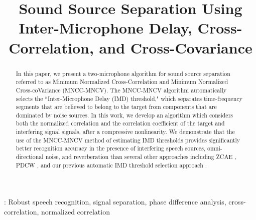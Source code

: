 \documentclass{article}
\title{Sound Source Separation Using Inter-Microphone Delay, Cross-Correlation,
and Cross-Covariance}
\begin{document}
%
  \maketitle
  \begin{abstract}
In this paper, we present a two-microphone algorithm for sound source separation 
    referred to as Minimum Normalized Cross-Correlation and Minimum Normalized 
    Cross-coVariance (MNCC-MNCV).  
    The MNCC-MNCV algorithm automatically selects the ``Inter-Microphone
    Delay (IMD) threshold," which separates time-frequency segments that are believed to
    belong to the target from components that are dominated by noise sources.
    In this work, we develop an algorithm which considers both the
    normalized correlation and the correlation coefficient of the target and
    interfering signal signals, after a compressive nonlinearity. 
We demonstrate that the use of the MNCC-MNCV method of estimating IMD
    thresholds  provides significantly better recognition accuracy in the
    presence of   interfering speech sources, omni-directional noise, and
    reverberation than several other approaches including ZCAE
    \cite{H_Park_SpeechComm_2009}, PDCW \cite{C_Kim_INTERSPEECH_2009_1}, and
    our previous automatic IMD threshold selection approach
    \cite{C_Kim_INTERSPEECH_2010_1}. 
  \end{abstract}
%  
  : Robust speech recognition, signal separation, phase difference analysis,  cross-correlation, normalized correlation
%
%
\end{document}
